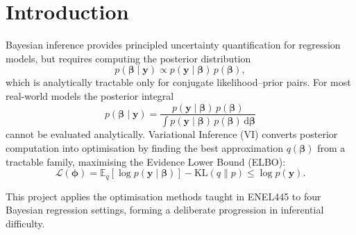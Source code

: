 \documentclass[11pt,a4paper]{article}
\newcommand{\E}{\mathbb{E}}
\begin{document}
\newpage
\tableofcontents
\newpage

\section*{Introduction}

Bayesian inference provides principled uncertainty quantification for regression models,
but requires computing the posterior distribution
\begin{equation*}
  p(\bm{\beta} \mid \bm{y}) \propto p(\bm{y} \mid \bm{\beta})\,p(\bm{\beta}),
\end{equation*}
which is analytically tractable only for conjugate likelihood--prior pairs.
For most real-world models the posterior integral
\begin{equation*}
  p(\bm{\beta} \mid \bm{y})
  = \frac{p(\bm{y} \mid \bm{\beta})\,p(\bm{\beta})}
         {\displaystyle\int p(\bm{y} \mid \bm{\beta})\,p(\bm{\beta})\, \mathrm{d}\bm{\beta}}
\end{equation*}
cannot be evaluated analytically.
Variational Inference (VI) converts posterior computation into optimisation by finding
the best approximation $q(\bm{\beta})$ from a tractable family, maximising the
Evidence Lower Bound (ELBO):
\begin{equation*}
  \mathcal{L}(\bm{\phi})
  = \E_{q}[\log p(\bm{y}\mid\bm{\beta})]
  - \mathrm{KL}(q \| p)
  \leq \log p(\bm{y}).
\end{equation*}

This project applies the optimisation methods taught in ENEL445 to four Bayesian
regression settings, forming a deliberate progression in inferential difficulty.
\end{document}
